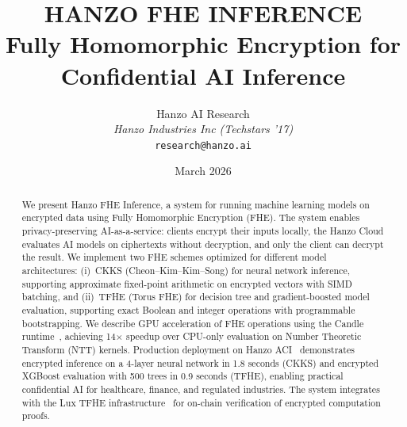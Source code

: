 \documentclass[11pt]{article}
\title{HANZO FHE INFERENCE\\[0.3em]
{\large Fully Homomorphic Encryption for\\Confidential AI Inference}}
\author{
    Hanzo AI Research \\
    \textit{Hanzo Industries Inc (Techstars '17)} \\
    \texttt{research@hanzo.ai}
}
\date{March 2026}
\begin{document}
\hanzocoverpage

\begin{abstract}
We present Hanzo FHE Inference, a system for running machine learning models on
encrypted data using Fully Homomorphic Encryption (FHE). The system enables
privacy-preserving AI-as-a-service: clients encrypt their inputs locally, the
Hanzo Cloud evaluates AI models on ciphertexts without decryption, and only the
client can decrypt the result. We implement two FHE schemes optimized for
different model architectures: (i)~CKKS (Cheon--Kim--Kim--Song) for neural
network inference, supporting approximate fixed-point arithmetic on encrypted
vectors with SIMD batching, and (ii)~TFHE (Torus FHE) for decision tree and
gradient-boosted model evaluation, supporting exact Boolean and integer
operations with programmable bootstrapping. We describe GPU acceleration of FHE
operations using the Candle runtime~\cite{hanzocandle}, achieving 14$\times$
speedup over CPU-only evaluation on Number Theoretic Transform (NTT) kernels.
Production deployment on Hanzo ACI~\cite{hanzoaci} demonstrates encrypted
inference on a 4-layer neural network in 1.8 seconds (CKKS) and encrypted
XGBoost evaluation with 500 trees in 0.9 seconds (TFHE), enabling practical
confidential AI for healthcare, finance, and regulated industries. The system
integrates with the Lux TFHE infrastructure~\cite{luxtfhe} for on-chain
verification of encrypted computation proofs.
\end{abstract}













\end{document}
